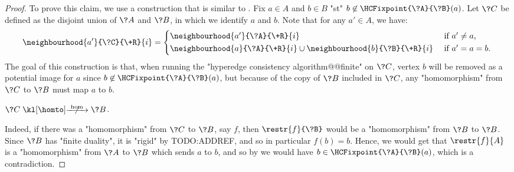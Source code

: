\begin{proof}
	To prove this claim, we use a construction that is similar to .
	Fix $a\in A$ and $b\in B$ "st" $b \not\in \HCFixpoint{\?A}{\?B}(a)$.
	Let $\?C$ be defined as the disjoint union of $\?A$ and $\?B$,
	in which we identify $a$ and $b$.
	Note that for any $a' \in A$, we have:
	\[
		\neighbourhood{a'}{\?C}{\+R}{i} =
		\begin{cases*}
			\neighbourhood{a'}{\?A}{\+R}{i} & \text{ if $a' \neq a$,}\\
			\neighbourhood{a}{\?A}{\+R}{i} \cup \neighbourhood{b}{\?B}{\+R}{i}  & \text{ if $a' = a = b$.}
		\end{cases*}	
	\]
	The goal of this construction
	is that, when running the "hyperedge consistency algorithm@@finite" on $\?C$,
	vertex $b$ will be removed as a potential image for $a$ since $b \not\in \HCFixpoint{\?A}{\?B}(a)$, but because of the copy of $\?B$ included in $\?C$, any "homomorphism" from $\?C$ to $\?B$ must map $a$ to $b$.

	\begin{claim}
		\AP\label{claim:hyperedge-consistency-uniform-convergence-hom-union}
		$\?C \nothomto \?B$.
	\end{claim} 

	Indeed, if there was a "homomorphism" from $\?C$ to $\?B$, say $f$, then
	$\restr{f}{\?B}$ would be a "homomorphism" from $\?B$ to $\?B$.
	Since $\?B$ has "finite duality", it is "rigid" by TODO:ADDREF, and
	so in particular $f(b) = b$.
	Hence, we would get that $\restr{f}{A}$ is a "homomorphism" from $\?A$ to $\?B$
	which sends $a$ to $b$, and so by 
	we would have $b \in \HCFixpoint{\?A}{\?B}(a)$, which is a contradiction.


\end{proof}
